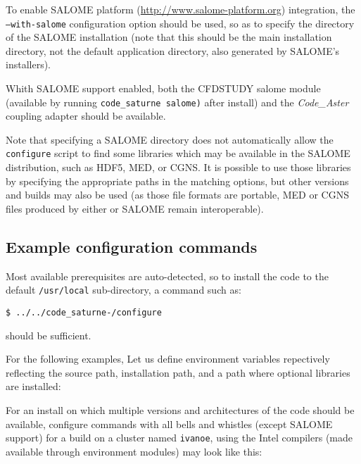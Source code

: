 \documentclass[a4paper,10pt,twoside]{csshortdoc}
\begin{document}
To enable SALOME platform (\url{http://www.salome-platform.org}) integration,
the \texttt{--with-salome} configuration option should be used, so as to
specify the directory of the SALOME installation (note that this should be
the main installation directory, not the default application directory,
also generated by SALOME's installers).

Whith SALOME support enabled, both the CFDSTUDY salome module
(available by running \texttt{code\_saturne salome)} after install)
and the \textit{Code\_Aster} coupling adapter should be available.

Note that specifying a SALOME directory does not automatically
allow the \CS \texttt{configure} script to find some libraries
which may be available in the SALOME distribution, such as HDF5,
MED, or CGNS. It is possible to use those libraries by specifying
the appropriate paths in the matching options, but other versions and builds
may also be used (as those file formats are portable, MED or CGNS files produced
by either \CS or SALOME remain interoperable).

\subsection{Example configuration commands\label{sec:config:examples}}

Most available prerequisites are auto-detected, so to install the
code to the default \texttt{/usr/local} sub-directory,
a command such as:

\texttt{\$ ../../code\_saturne-\verscs/configure}

should be sufficient.

For the following examples, Let us define environment variables repectively
reflecting the \CS source path, installation path, and a path where optional
libraries are installed:


For an install on which multiple
versions and architectures of the code should be available,
configure commands with all bells and whistles (except SALOME support) for a
build on a cluster named \texttt{ivanoe}, using the Intel compilers
(made available through environment modules) may look like this:
\end{document}
